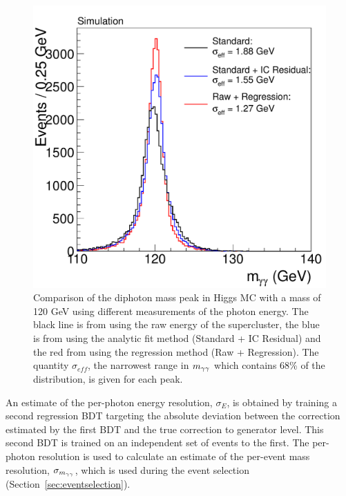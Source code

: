 \begin{figure}
\includegraphics[width=.6\textwidth]{hgg7TeV/generalPlots/regrresall.pdf}
\caption{Comparison of the diphoton mass peak in Higgs MC with a mass of 120 GeV using different 
measurements of the photon energy. The black line 
is from using the raw energy of the supercluster, the blue is from using the analytic fit method 
(Standard + IC Residual) 
and the red from using the regression method (Raw + Regression). The quantity $\sigma_{eff}$,
the narrowest range in $m_{\gamma\gamma}$ which contains 68\% of the distribution, is given for each peak.}
\label{fig:mcregrcomparison}
\end{figure}

An estimate of the per-photon energy resolution, $\sigma_{E}$, is obtained by training a second 
regression BDT targeting the absolute deviation between the correction estimated by the 
first BDT and the true correction to generator level. This second BDT is trained on an independent
set of events to the first. The per-photon resolution is used to calculate an estimate of the 
per-event mass resolution, $\sigma_{m_{\gamma\gamma}}$, which is used during the event selection 
(Section~\ref{sec:eventselection}). 

